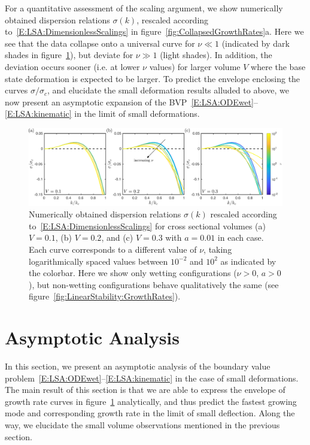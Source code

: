 \documentclass{jfm}
\newcommand{\aspect}{a} %
\begin{document}
For a quantitative assessment of the scaling argument, we show numerically obtained dispersion relations $\sigma(k)$, rescaled according to~\eqref{E:LSA:DimensionlessScalings} in figure~\ref{fig:CollapsedGrowthRates}a. Here we see that the data collapse onto a universal curve for $\nu \ll 1$ (indicated by dark shades in figure~\ref{fig:RescaledGrowthRates}), but deviate for $\nu \gg 1$ (light shades). In addition, the deviation occurs sooner (i.e. at lower $\nu$ values) for larger volume $V$ where the base state deformation is expected to be larger. To predict the envelope enclosing the curves $\sigma/\sigma_c$, and elucidate the small deformation results alluded to above, we now present an asymptotic expansion of the BVP~\eqref{E:LSA:ODEwet}--\eqref{E:LSA:kinematic} in the limit of small deformations.

\begin{figure}
\centering
\includegraphics[width = \textwidth]{figures/rescaled_growth_rates.pdf}
\caption{Numerically obtained dispersion relations $\sigma(k)$ rescaled according to~\eqref{E:LSA:DimensionlessScalings} for cross sectional volumes (a) $V = 0.1$, (b) $V = 0.2$, and (c) $V = 0.3$ with $\aspect = 0.01$ in each case. Each curve corresponds to a different value of $\nu$, taking logarithmically spaced values between $10^{-2}$ and $10^{2}$ as indicated by the colorbar. Here we show only wetting configurations ($\nu >0$, $a >0$), but non-wetting configurations behave qualitatively the same (see figure~\ref{fig:LinearStability:GrowthRates}). }
\label{fig:RescaledGrowthRates}
\end{figure}

\section{Asymptotic Analysis}\label{S:Asymptotics}
\newcommand{\param}{\delta} %
In this section, we present an asymptotic analysis of the boundary value problem~\eqref{E:LSA:ODEwet}--\eqref{E:LSA:kinematic}  in the case of small deformations. The main result of this section is that we are able to express the envelope of growth rate curves in figure~\ref{fig:RescaledGrowthRates} analytically, and thus predict the fastest growing mode and corresponding growth rate in the limit of small deflection. Along the way, we elucidate the small volume observations mentioned in the previous section.
\end{document}
